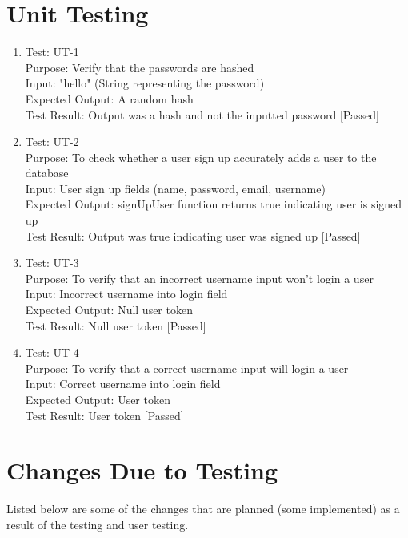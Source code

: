 \documentclass[12pt, titlepage]{article}
\begin{document}
\section{Unit Testing}
\begin{enumerate}
	\item Test: UT-1 \\
	Purpose: Verify that the passwords are hashed \\
	Input: "hello" (String representing the password)\\
	Expected Output: A random hash\\
	Test Result:  Output was a hash and not the inputted password [Passed]\\

  \item Test: UT-2 \\
	Purpose: To check whether a user sign up accurately adds a user to the database\\
	Input: User sign up fields (name, password, email, username)\\
	Expected Output: signUpUser function returns true indicating user is signed up\\
	Test Result:  Output was true indicating user was signed up [Passed]\\

  \item Test: UT-3 \\
	Purpose: To verify that an incorrect username input won't login a user \\
	Input: Incorrect username into login field \\
	Expected Output: Null user token\\
	Test Result: Null user token [Passed]\\

  \item Test: UT-4 \\
	Purpose: To verify that a correct username input will login a user \\
	Input: Correct username into login field \\
	Expected Output: User token\\
	Test Result: User token [Passed]\\
\end{enumerate}

\section{Changes Due to Testing}
Listed below are some of the changes that are planned (some implemented) as a result of the testing and user testing.
\end{document}
